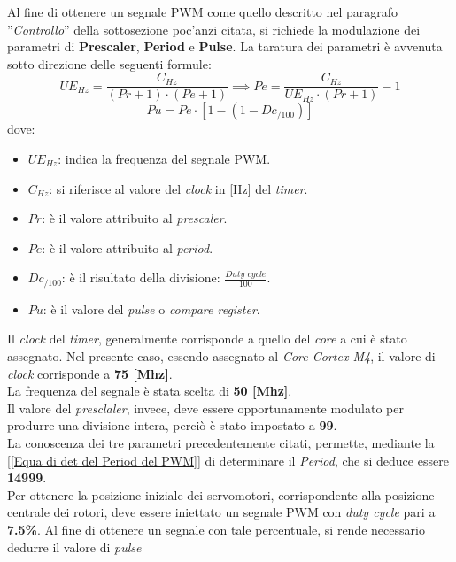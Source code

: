 Al fine di ottenere un segnale PWM come quello descritto nel paragrafo ''\textit{Controllo}'' della sottosezione poc'anzi citata, si richiede la modulazione dei parametri di \textbf{Prescaler}, \textbf{Period} e \textbf{Pulse}.
La taratura dei parametri è avvenuta sotto direzione delle seguenti formule:
\begin{equation}
    \label{Equa di det del Period del PWM}
    UE_{Hz} = \frac{C_{Hz}}{(Pr+1)\cdot(Pe+1)} \implies Pe = \frac{C_{Hz}}{UE_{Hz}\cdot(Pr+1)}-1
\end{equation}
\begin{equation}
    \label{equatione di determinazione del pulse}
    Pu = Pe\cdot[1-(1-Dc_{/100})]
\end{equation}
dove:
\begin{itemize}
    \item $UE_{Hz}$: indica la frequenza del segnale PWM.
    \item $C_{Hz}$: si riferisce al valore del \textit{clock} in [Hz] del \textit{timer}.
    \item $Pr$: è il valore attribuito al \textit{prescaler}.
    \item $Pe$: è il valore attribuito al \textit{period}.
    \item $Dc_{/100}$: è il risultato della divisione: $\frac{Duty\,\,cycle}{100}$. 
    \item $Pu$: è il valore del \textit{pulse} o \textit{compare register}.    
\end{itemize}
Il \textit{clock} del \textit{timer}, generalmente corrisponde a quello del \textit{core} a cui è stato assegnato. Nel presente caso, essendo assegnato al \textit{Core Cortex-M4}, il valore di \textit{clock} corrisponde a \textbf{75 [Mhz]}.\\
La frequenza del segnale è stata scelta di \textbf{50 [Mhz]}.\\
Il valore del \textit{presclaler}, invece, deve essere opportunamente modulato per produrre una divisione intera, perciò è stato impostato a \textbf{99}.\\
La conoscenza dei tre parametri precedentemente citati, permette, mediante la [\ref{Equa di det del Period del PWM}] di determinare il \textit{Period}, che si deduce essere \textbf{14999}.\\
Per ottenere la posizione iniziale dei servomotori, corrispondente alla posizione centrale dei rotori, deve essere iniettato un segnale PWM con \textit{duty cycle} pari a \textbf{7.5\%}. Al fine di ottenere un segnale con tale percentuale, si rende necessario dedurre il valore di \textit{pulse}
